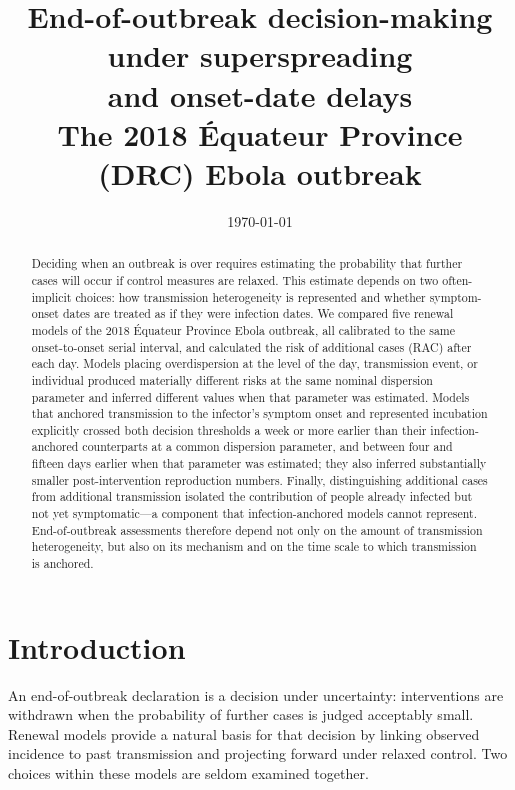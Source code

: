 \documentclass[11pt,a4paper]{article}
\title{End-of-outbreak decision-making under superspreading\\ and onset-date delays\\[4pt]
  \large The 2018 \'Equateur Province (DRC) Ebola outbreak}
\date{\today}
\author{}
\theoremstyle{plain}
\theoremstyle{definition}
\begin{document}
\maketitle
\vspace{-1.6\baselineskip}

\begin{abstract}
\noindent
Deciding when an outbreak is over requires estimating the probability that further cases will
occur if control measures are relaxed. This estimate depends on two often-implicit choices: how
transmission heterogeneity is represented and whether symptom-onset dates are treated as if they
were infection dates. We compared five renewal models of the 2018 \'Equateur Province Ebola
outbreak, all calibrated to the same onset-to-onset serial interval, and calculated the risk of
additional cases (RAC) after each day. Models placing overdispersion at the level of the day,
transmission event, or individual produced materially different risks at the same nominal
dispersion parameter and inferred different values when that parameter was estimated. Models
that anchored transmission to the infector's symptom onset and represented incubation explicitly
crossed both decision thresholds a week or more earlier than their infection-anchored
counterparts at a common dispersion parameter, and between four and fifteen days earlier when
that parameter was estimated; they also inferred substantially smaller post-intervention
reproduction numbers. Finally,
distinguishing additional cases from additional transmission isolated the contribution of people
already infected but not yet symptomatic---a component that infection-anchored models cannot
represent. End-of-outbreak assessments therefore depend not only on the amount of transmission
heterogeneity, but also on its mechanism and on the time scale to which transmission is anchored.
\end{abstract}

\section{Introduction}
\label{sec:introduction}

An end-of-outbreak declaration is a decision under uncertainty: interventions are withdrawn
when the probability of further cases is judged acceptably small. Renewal models provide a
natural basis for that decision by linking observed incidence to past transmission and projecting
forward under relaxed control. Two choices within these models are seldom examined together.
\end{document}

